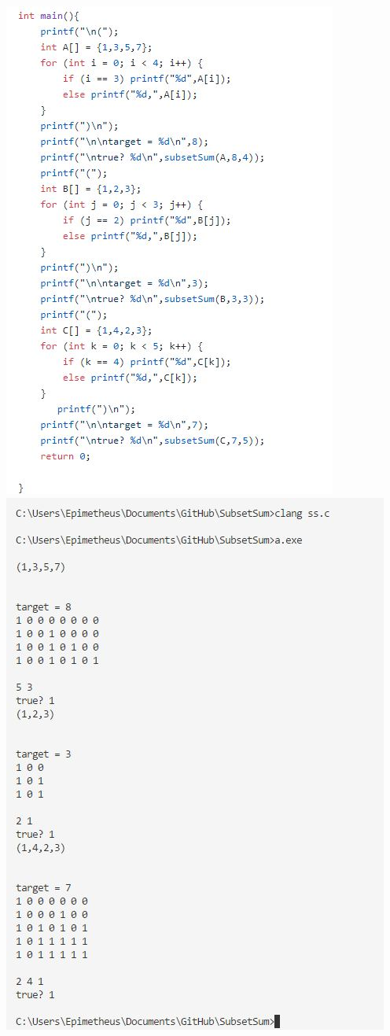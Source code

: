 \documentclass[12pt]{article}
\begin{document}
\noindent \includegraphics{code2.jpg}\\
\noindent \includegraphics{subsetsum.jpg}\\
\end{document}
